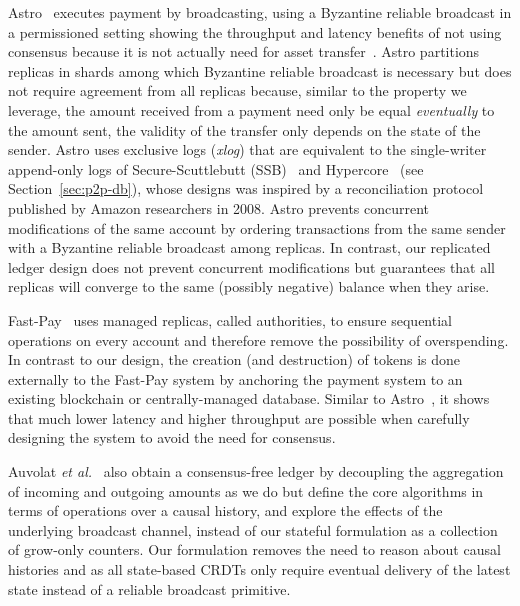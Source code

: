 \documentclass[9pt, oneside]{article}   	%
\begin{document}
Astro~\cite{collins2020broadcast-payment} executes payment by broadcasting, using a Byzantine reliable broadcast in a permissioned setting showing the throughput and latency benefits of not using consensus because it is not actually need for asset transfer~\cite{guerraoui2021consensus}. 
Astro partitions replicas in shards among which Byzantine reliable broadcast is necessary but does not require agreement from all replicas because, similar to the property we leverage, the amount received from a payment need only be equal \textit{eventually} to the amount sent, the validity of the transfer only depends on the state of the sender. Astro uses exclusive logs (\textit{xlog}) that are equivalent to the single-writer append-only logs of Secure-Scuttlebutt (SSB)~\cite{kermarrec2020gossiping,tarr2019ssb} and Hypercore~\cite{hypercore-website} (see Section~\ref{sec:p2p-db}), whose designs was inspired by a reconciliation protocol~\cite{vanRenesse2008reconciliation} published by Amazon researchers in 2008. Astro prevents concurrent modifications of the same account by ordering transactions from the same sender with a Byzantine reliable broadcast among replicas. In contrast, our replicated ledger design does not prevent concurrent modifications but guarantees that all replicas will converge to the same (possibly negative) balance when they arise.

Fast-Pay~\cite{baudet2020fastpay} uses managed replicas, called authorities, to ensure sequential operations on every account and therefore remove the possibility of overspending. In contrast to our design, the creation (and destruction) of tokens is done externally to the Fast-Pay system by anchoring the payment system to an existing blockchain or centrally-managed database. Similar to Astro~\cite{collins2020broadcast-payment}, it shows that much lower latency and higher throughput are possible when carefully designing the system to avoid the need for consensus.

Auvolat \textit{et al.}~\cite{auvolat2021money} also obtain a consensus-free ledger by decoupling the aggregation of incoming and outgoing amounts as we do but define the core algorithms in terms of operations over a causal history, and explore the effects of the underlying broadcast channel, instead of our stateful formulation as a collection of grow-only counters. Our formulation removes the need to reason about causal histories and as all state-based CRDTs only require eventual delivery of the latest state instead of a reliable broadcast primitive.
\end{document}
